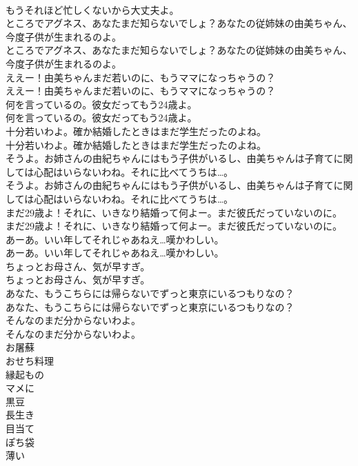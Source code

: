 \documentclass[8pt]{extreport}
\begin{document}
\begin{CJK}{UTF8}{min}
\\	もうそれほど忙しくないから大丈夫よ。 
\\	ところでアグネス、あなたまだ知らないでしょ？あなたの従姉妹の由美ちゃん、今度子供が生まれるのよ。	
\\	ところでアグネス、あなたまだ知らないでしょ？あなたの従姉妹の由美ちゃん、今度子供が生まれるのよ。 
\\	ええー！由美ちゃんまだ若いのに、もうママになっちゃうの？	
\\	ええー！由美ちゃんまだ若いのに、もうママになっちゃうの？ 
\\	何を言っているの。彼女だってもう24歳よ。	
\\	何を言っているの。彼女だってもう24歳よ。 
\\	十分若いわよ。確か結婚したときはまだ学生だったのよね。	
\\	十分若いわよ。確か結婚したときはまだ学生だったのよね。 
\\	そうよ。お姉さんの由紀ちゃんにはもう子供がいるし、由美ちゃんは子育てに関しては心配はいらないわね。それに比べてうちは…。	
\\	そうよ。お姉さんの由紀ちゃんにはもう子供がいるし、由美ちゃんは子育てに関しては心配はいらないわね。それに比べてうちは…。 
\\	まだ29歳よ！それに、いきなり結婚って何よー。まだ彼氏だっていないのに。	
\\	まだ29歳よ！それに、いきなり結婚って何よー。まだ彼氏だっていないのに。 
\\	あーあ。いい年してそれじゃあねえ…嘆かわしい。	
\\	あーあ。いい年してそれじゃあねえ…嘆かわしい。 
\\	ちょっとお母さん、気が早すぎ。	
\\	ちょっとお母さん、気が早すぎ。 
\\	あなた、もうこちらには帰らないでずっと東京にいるつもりなの？	
\\	あなた、もうこちらには帰らないでずっと東京にいるつもりなの？ 
\\	そんなのまだ分からないわよ。	
\\	そんなのまだ分からないわよ。 
\\	お屠蘇
\\	おせち料理
\\	縁起もの
\\	マメに
\\	黒豆
\\	長生き
\\	目当て
\\	ぽち袋
\\	薄い

\end{CJK}
\end{document}
